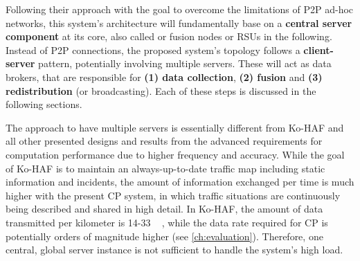 Following their approach with the goal to overcome the limitations of P2P ad-hoc networks, this system's architecture will fundamentally base on a \textbf{central server component} at its core, also called or fusion nodes or RSUs in the following. Instead of P2P connections, the proposed system's topology follows a \textbf{client-server} pattern, potentially involving multiple servers. These will act as data brokers, that are responsible for \textbf{(1) data collection}, \textbf{(2) fusion} and \textbf{(3) redistribution} (or broadcasting). Each of these steps is discussed in the following sections.

The approach to have multiple servers is essentially different from Ko-HAF and all other presented designs and results from the advanced requirements for computation performance due to higher frequency and accuracy. While the goal of Ko-HAF is to maintain an always-up-to-date traffic map including static information and incidents, the amount of information exchanged per time is much higher with the present CP system, in which traffic situations are continuously being described and shared in high detail. In Ko-HAF, the amount of data transmitted per kilometer is 14-33 \si{\kilo\byte} \cite{Hohm2019}, while the data rate required for CP is potentially orders of magnitude higher (see \autoref{ch:evaluation}). Therefore, one central, global server instance is not sufficient to handle the system's high load.

